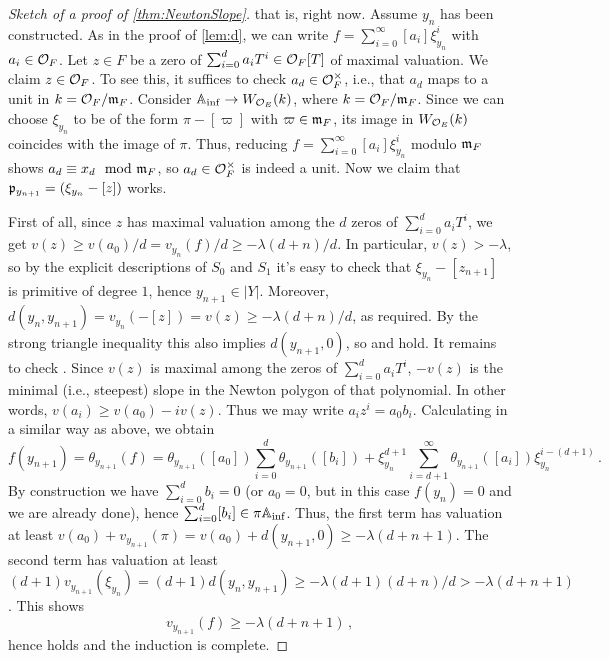 \documentclass[a4paper, 10pt, oneside, DIV=9, chapterprefix=true, numbers=enddot,bibliography=totoc]{scrbook}
\begin{document}
\begin{proof}[Sketch of a proof of \cref{thm:NewtonSlope}]
	\dotso that is, right now. Assume $y_n$ has been constructed. As in the proof of \cref{lem:d}, we can write $f=\sum_{i=0}^\infty [a_i]\xi_{y_n}^i$ with $a_i\in\mathcal{O}_F$. Let $z\in F$ be a zero of $\sum_{i=0}^da_iT^i\in\mathcal{O}_F[T]$ of maximal valuation. We claim $z\in\mathcal{O}_F$. To see this, it suffices to check $a_d\in\mathcal{O}_F^\times$, i.e., that $a_d$ maps to a unit in $k=\mathcal{O}_F/\mathfrak{m}_F$. Consider $\IA_\inf\morphism W_{\Oo_E}(k)$, where $k=\mathcal{O}_F/\mathfrak{m}_F$. Since we can choose $\xi_{y_n}$ to be of the form $\pi-[\varpi]$ with $\varpi\in \mathfrak{m}_F$, its image in $W_{\mathcal{O}_E}(k)$ coincides with the image of $\pi$. Thus, reducing $f=\sum_{i=0}^\infty [a_i]\xi_{y_n}^i$ modulo $\mathfrak{m}_F$ shows $a_d\equiv x_d\mod {\mathfrak{m}}_F$, so $a_d\in\mathcal{O}_F^\times$ is indeed a unit. Now we claim that $\mathfrak{p}_{y_{n+1}}=(\xi_{y_n}-[z])$ works.
	
	First of all, since $z$ has maximal valuation among the $d$ zeros of $\sum_{i=0}^da_iT^i$, we get $v(z)\geq v(a_0)/d=v_{y_n}(f)/d\geq -\lambda(d+n)/d$. In particular, $v(z)>-\lambda$, so by the explicit descriptions of $S_0$ and $S_1$ it's easy to check that $\xi_{y_n}-[z_{n+1}]$ is primitive of degree $1$, hence $y_{n+1}\in|Y|$. Moreover, $d(y_n,y_{n+1})=v_{y_n}(-[z])=v(z)\geq -\lambda(d+n)/d$, as required. By the strong triangle inequality this also implies $d(y_{n+1},0)$, so  and  hold. It remains to check . Since $v(z)$ is maximal among the zeros of $\sum_{i=0}^da_iT^i$, $-v(z)$ is the minimal (i.e., steepest) slope in the Newton polygon of that polynomial. In other words, $v(a_i)\geq v(a_0)-iv(z)$. Thus we may write $a_iz^i=a_0b_i$. Calculating in a similar way as above, we obtain
	\begin{equation*}
		f(y_{n+1})=\theta_{y_{n+1}}(f)=\theta_{y_{n+1}}([a_0])\sum_{i=0}^d\theta_{y_{n+1}}([b_i])+\xi_{y_n}^{d+1}\sum_{i=d+1}^\infty \theta_{y_{n+1}}([a_i])\xi_{y_n}^{i-(d+1)}\,.
	\end{equation*}
	By construction we have $\sum_{i=0}^db_i=0$ (or $a_0=0$, but in this case $f(y_n)=0$ and we are already done), hence $\sum_{i=0}^d[b_i]\in\pi\mathbb{A}_{\mathrm{inf}}$. Thus, the first term has valuation at least $v(a_0)+v_{y_{n+1}}(\pi)=v(a_0)+d(y_{n+1},0)\geq -\lambda (d+n+1)$. The second term has valuation at least $(d+1)v_{y_{n+1}}(\xi_{y_n})=(d+1)d(y_n,y_{n+1})\geq -\lambda(d+1)(d+n)/d>-\lambda(d+n+1)$. This shows
	\begin{equation*}
		v_{y_{n+1}}(f)\geq -\lambda(d+n+1)\,,
	\end{equation*}
	hence  holds and the induction is complete.
\end{proof}
\end{document}
